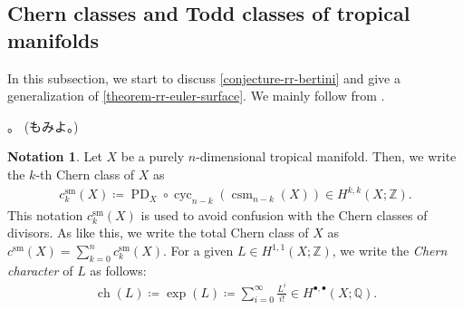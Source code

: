 \documentclass[a4paper,dvipdfmx,reqno,12pt]{amsart}
\theoremstyle{definition}
\newtheorem{notation}[theorem]{Notation}
\newcommand{\deq}{\coloneqq}
\newcommand{\opn}[1]{\operatorname{#1}}
\numberwithin{equation}{section}
\begin{document}
\subsection{Chern classes and Todd classes of
tropical manifolds}
In this subsection, we start to discuss
\cref{conjecture-rr-bertini} and give a generalization
of \cref{theorem-rr-euler-surface}.
We mainly follow
from \cite{MR1335917,MR1644323,MR2810322}.

\cite[Definition 5.4]{MR4637248}。
(\cite[Definition 4.13]{MR3894860}もみよ。)


\begin{notation}
Let $X$ be a purely $n$-dimensional tropical manifold.
Then, we write the $k$-th Chern class of $X$ as
\begin{align}
c_{k}^{\mathrm{sm}}(X)\deq
\opn{PD}_X\circ \opn{cyc}_{n-k}(\opn{csm}_{n-k}(X))
\in H^{k,k}(X;\mathbb{Z}).
\end{align}
This notation $c_{k}^{\mathrm{sm}}(X)$
is used to avoid confusion with the Chern classes of divisors.
As like this, we write the total Chern class of $X$ as
$c^{\mathrm{sm}}(X)=\sum_{k=0}^{n} c_{k}^{\mathrm{sm}}(X)$.
For a given $L\in H^{1,1}(X;\mathbb{Z})$, we write
the \emph{Chern character} of $L$ as follows:
\begin{align}
\opn{ch}(L)\deq \opn{exp}(L)
\deq \sum_{i=0}^{\infty}\frac{L^{i}}{i!}\in 
H^{\bullet,\bullet}(X;\mathbb{Q}).
\end{align}
\end{notation}
\end{document}
